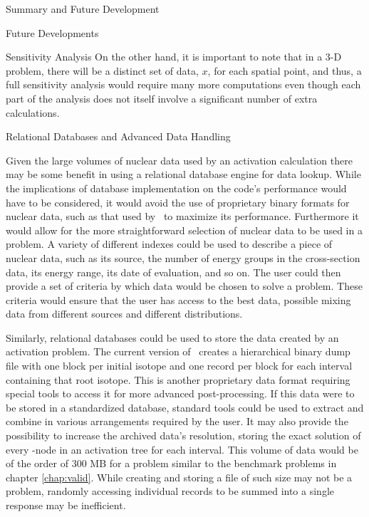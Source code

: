 \begin{chapter}{Summary and Future Development}
\begin{section}{Future Developments}
\begin{subsection}{Sensitivity Analysis}
      On the other hand, it is important to note that in a 3-D problem,
      there will be a distinct set of data, $x$, for each spatial point,
      and thus, a full sensitivity analysis would require many more
      computations even though each part of the analysis does not itself
      involve a significant number of extra calculations.
      
    \end{subsection}

    \begin{subsection}{Relational Databases and Advanced Data Handling}
      
      Given the large volumes of nuclear data used by an activation
      calculation there may be some benefit in using a relational
      database engine for data lookup.  While the implications of
      database implementation on the code's performance would have to
      be considered, it would avoid the use of proprietary binary
      formats for nuclear data, such as that used by \ALARA\  to
      maximize its performance.  Furthermore it would allow for the
      more straightforward selection of nuclear data to be used in a
      problem.  A variety of different indexes could be used to
      describe a piece of nuclear data, such as its source, the number
      of energy groups in the cross-section data, its energy range,
      its date of evaluation, and so on.  The user could then provide
      a set of criteria by which data would be chosen to solve a
      problem.  These criteria would ensure that the user has access
      to the best data, possible mixing data from different sources
      and different distributions.
      
      Similarly, relational databases could be used to store the data
      created by an activation problem.  The current version of
      \ALARA\  creates a hierarchical binary dump file with one block
      per initial isotope and one record per block for each interval
      containing that root isotope.  This is another proprietary data
      format requiring special tools to access it for more advanced
      post-processing.  If this data were to be stored in a
      standardized database, standard tools could be used to extract
      and combine in various arrangements required by the user.  It
      may also provide the possibility to increase the archived data's
      resolution, storing the exact solution of every \pc-node in an
      activation tree for each interval.  This volume of data would be
      of the order of 300 MB for a problem similar to the benchmark
      problems in chapter \ref{chap:valid}.  While creating and
      storing a file of such size may not be a problem, randomly
      accessing individual records to be summed into a single response
      may be inefficient.
      

\end{subsection}
\end{section}
\end{chapter}

